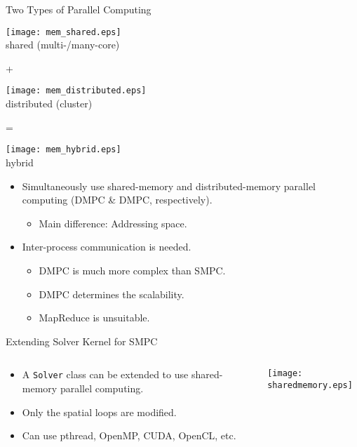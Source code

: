 \documentclass[dvips,xcolor=pst,14pt]{beamer}
\begin{document}
\begin{frame}{
%
Two Types of Parallel Computing
%
}
\begin{minipage}[c]{\textwidth}\centering \footnotesize
\parbox{0.3\textwidth}{\centering 
\texttt{[image: mem\_shared.eps]} \\ \scriptsize shared
(multi-/many-core)}
+ 
\parbox{0.3\textwidth}{\centering
\texttt{[image: mem\_distributed.eps]} \\ \footnotesize
distributed (cluster)}
= 
\parbox{0.3\textwidth}{\centering
\texttt{[image: mem\_hybrid.eps]} \\ \footnotesize hybrid}
\end{minipage}
\begin{itemize}
  \item Simultaneously use shared-memory and distributed-memory parallel
  computing (DMPC \& DMPC, respectively).
  \begin{itemize}
    \item Main difference: \alert{Addressing space}.
  \end{itemize}
  \item Inter-process communication is needed.
  \begin{itemize}
    \item DMPC is much more complex than SMPC.
    \item \alert{DMPC determines the scalability}.
    \item \alert{MapReduce is unsuitable}.
  \end{itemize}
\end{itemize}
\end{frame}

\begin{frame}{
%
Extending Solver Kernel for SMPC
%
}
\begin{columns}[c]
\begin{column}{.75\textwidth}
\begin{itemize}
  \item A \texttt{Solver} class can be extended to use shared-memory parallel
  computing.
  \item Only the spatial loops are modified.
  \item Can use pthread, OpenMP, CUDA, OpenCL, etc.
\end{itemize}
\end{column}
\begin{column}{.25\textwidth} \centering
  \texttt{[image: sharedmemory.eps]}
\end{column}
\end{columns}
\end{frame}
\end{document}
